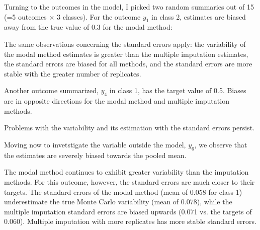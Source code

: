 \begin{stlog} 
  \nullskip
\end{stlog}

Turning to the outcomes in the model,
I picked two random summaries out of 15 
(=5 outcomes $\times$ 3 classes).
For the outcome $y_1$ in class 2, estimates are biased
away from the true value of 0.3 for the modal method:

\begin{stlog} 
  \nullskip
\end{stlog}

The same observations concerning the standard errors apply: 
the variability of the modal method estimates is greater than 
the multiple imputation estimates, the standard errors are biased
for all methods, and the standard errors are 
more stable with the greater number of replicates.

\begin{stlog} 
  \nullskip
\end{stlog}

Another outcome summarized, $y_4$ in class 1, has the target value
of 0.5. Biases are in opposite directions for the modal method
and multiple imputation methods. 

\begin{stlog} 
  \nullskip
\end{stlog}

Problems with the variability
and its estimation with the standard errors persist.

\begin{stlog} 
  \nullskip
\end{stlog}

Moving now to invetstigate the variable outside the model,
$y_6$, we observe that the estimates are severely biased
towards the pooled mean.

\begin{stlog} 
  \nullskip
  \nullskip
\end{stlog}

The modal method continues to exhibit greater variability
than the imputation methods.
For this outcome, however, the standard errors are much closer
to their targets. The standard errors of the modal method 
(mean of 0.058 for class 1) 
underestimate the true Monte Carlo variability (mean of 0.078), 
while the multiple imputation standard errors are biased upwards
(0.071 vs. the targets of 0.060).
Multiple imputation with more replicates has 
more stable standard errors.

